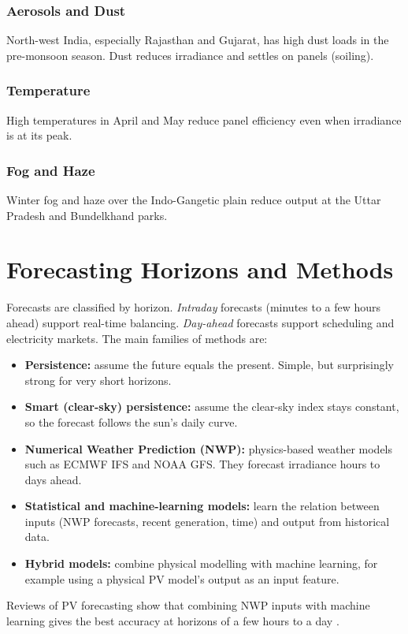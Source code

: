 \documentclass[12pt]{report}
\begin{document}
\subsubsection{Aerosols and Dust}
North-west India, especially Rajasthan and Gujarat, has high dust loads in the pre-monsoon season. Dust reduces irradiance and settles on panels (soiling).
\subsubsection{Temperature}
High temperatures in April and May reduce panel efficiency even when irradiance is at its peak.
\subsubsection{Fog and Haze}
Winter fog and haze over the Indo-Gangetic plain reduce output at the Uttar Pradesh and Bundelkhand parks.

\section{Forecasting Horizons and Methods}
\vspace{1mm}
Forecasts are classified by horizon. \textit{Intraday} forecasts (minutes to a few hours ahead) support real-time balancing. \textit{Day-ahead} forecasts support scheduling and electricity markets. The main families of methods are:
\begin{itemize}[noitemsep]
    \item \textbf{Persistence:} assume the future equals the present. Simple, but surprisingly strong for very short horizons.
    \item \textbf{Smart (clear-sky) persistence:} assume the clear-sky index stays constant, so the forecast follows the sun's daily curve.
    \item \textbf{Numerical Weather Prediction (NWP):} physics-based weather models such as ECMWF IFS and NOAA GFS. They forecast irradiance hours to days ahead.
    \item \textbf{Statistical and machine-learning models:} learn the relation between inputs (NWP forecasts, recent generation, time) and output from historical data.
    \item \textbf{Hybrid models:} combine physical modelling with machine learning, for example using a physical PV model's output as an input feature.
\end{itemize}
Reviews of PV forecasting show that combining NWP inputs with machine learning gives the best accuracy at horizons of a few hours to a day \cite{antonanzas2016, yang2018}.
\end{document}
